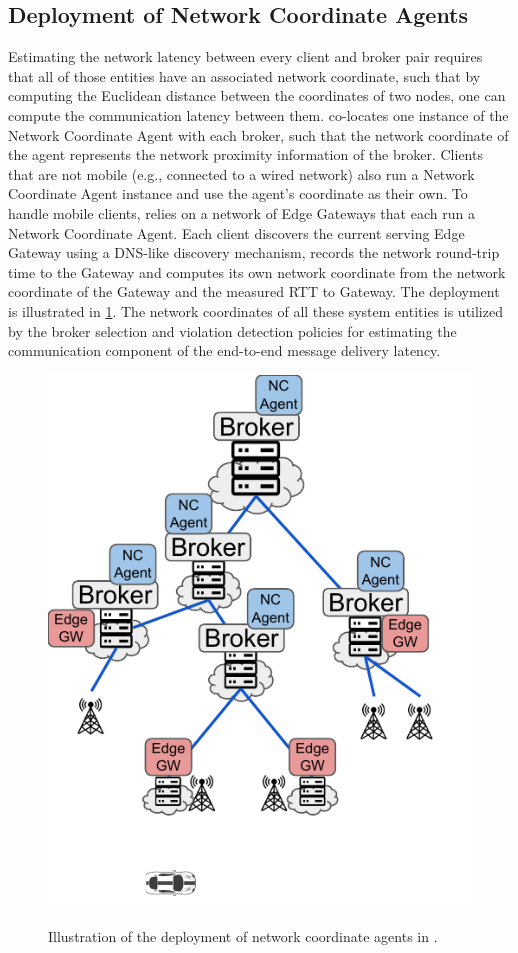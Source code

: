 \subsection{Deployment of Network Coordinate Agents}
Estimating the network latency between every client and broker pair requires that all of those entities have an associated network coordinate, such that by computing the Euclidean distance between the coordinates of two nodes, one can compute the communication latency between them. \epulsar{} co-locates one instance of the Network Coordinate Agent with each broker, such that the network coordinate of the agent represents the network proximity information of the broker. Clients that are not mobile (e.g., connected to a wired network) also run a Network Coordinate Agent instance and use the agent's coordinate as their own. To handle mobile clients, \epulsar{} relies on a network of Edge Gateways that each run a Network Coordinate Agent. Each client discovers the current serving Edge Gateway using a DNS-like discovery mechanism, records the network round-trip time to the Gateway and computes its own network coordinate from the network coordinate of the Gateway and the measured RTT to Gateway. The deployment is illustrated in \cref{fig:epulsar_nc_deployment}. The network coordinates of all these system entities is utilized by the broker selection and violation detection policies for estimating the communication component of the end-to-end message delivery latency. 
\begin{figure}[h]
\centering
\includegraphics[width=0.5\columnwidth]{figures/epulsar/nc_agent_deployment}
\label{fig:epulsar_nc_deployment}
\caption{Illustration of the deployment of network coordinate agents in \epulsar{}.}
\end{figure}

